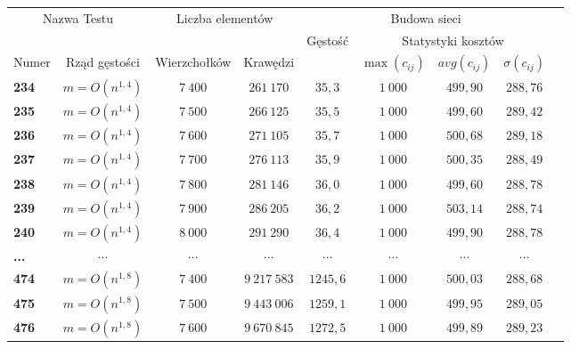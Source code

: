 \begin{table}[h]
\centering
\begin{tabular}{lcccccccc}
\hline
\multicolumn{2}{c|}{\multirow{2}{*}{Nazwa Testu}} & \multicolumn{2}{c|}{\multirow{2}{*}{Liczba elementów}} & \multicolumn{4}{c}{Budowa sieci} &  \\ \cline{5-9}
\multicolumn{2}{l|}{} & \multicolumn{2}{c|}{} & \multirow{2}{*}{Gęstość} & \multicolumn{3}{|c}{Statystyki kosztów} &  \\ \cline{1-4} \cline{6-9}
\multicolumn{1}{l|}{Numer} & \multicolumn{1}{c|}{Rząd gęstości} & \multicolumn{1}{c|}{Wierzchołków} & \multicolumn{1}{c|}{Krawędzi} & & \multicolumn{1}{|c}{$\max \left( c_{ij} \right) $} & \multicolumn{1}{|c}{$ avg \left( c_{ij} \right) $} & \multicolumn{1}{|c}{$\sigma \left( c_{ij} \right) $} &  \\
\hline
\textbf{234} & $ m = O \left( n^{1,4} \right) $ & $7~400$ & $261~170$ & $35,3$ & $1~000$ & $499,90$ & $288,76$ &  \\
\textbf{235} & $ m = O \left( n^{1,4} \right) $ & $7~500$ & $266~125$ & $35,5$ & $1~000$ & $499,60$ & $289,42$ &  \\
\textbf{236} & $ m = O \left( n^{1,4} \right) $ & $7~600$ & $271~105$ & $35,7$ & $1~000$ & $500,68$ & $289,18$ &  \\
\textbf{237} & $ m = O \left( n^{1,4} \right) $ & $7~700$ & $276~113$ & $35,9$ & $1~000$ & $500,35$ & $288,49$ &  \\
\textbf{238} & $ m = O \left( n^{1,4} \right) $ & $7~800$ & $281~146$ & $36,0$ & $1~000$ & $499,60$ & $288,78$ &  \\
\textbf{239} & $ m = O \left( n^{1,4} \right) $ & $7~900$ & $286~205$ & $36,2$ & $1~000$ & $503,14$ & $288,74$ &  \\
\textbf{240} & $ m = O \left( n^{1,4} \right) $ & $8~000$ & $291~290$ & $36,4$ & $1~000$ & $499,90$ & $288,78$ &  \\
\textbf{...} & $ \cdots $ & $ \cdots $ & $ \cdots $ & $ \cdots $ & $ \cdots $ & $ \cdots $ & $ \cdots $ &  \\
\textbf{474} & $ m = O \left( n^{1,8} \right) $ & $7~400$ & $9~217~583$ & $1245,6$ & $1~000$ & $500,03$ & $288,68$ &  \\
\textbf{475} & $ m = O \left( n^{1,8} \right) $ & $7~500$ & $9~443~006$ & $1259,1$ & $1~000$ & $499,95$ & $289,05$ &  \\
\textbf{476} & $ m = O \left( n^{1,8} \right) $ & $7~600$ & $9~670~845$ & $1272,5$ & $1~000$ & $499,89$ & $289,23$ &  \\

\end{tabular}
\end{table}
